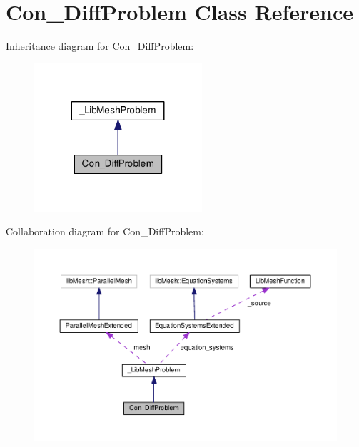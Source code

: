 \hypertarget{class_con___diff_problem}{\section{Con\-\_\-\-Diff\-Problem Class Reference}
\label{class_con___diff_problem}
}


Inheritance diagram for Con\-\_\-\-Diff\-Problem\-:\nopagebreak
\begin{figure}[H]
\begin{center}
\leavevmode
\includegraphics[width=176pt]{class_con___diff_problem__inherit__graph}
\end{center}
\end{figure}


Collaboration diagram for Con\-\_\-\-Diff\-Problem\-:\nopagebreak
\begin{figure}[H]
\begin{center}
\leavevmode
\includegraphics[width=350pt]{class_con___diff_problem__coll__graph}
\end{center}
\end{figure}
